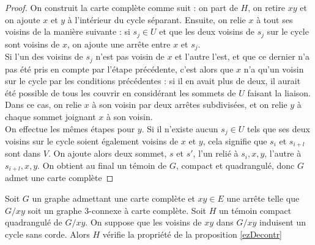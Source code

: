 \documentclass{scrartcl}
\begin{document}
\begin{flushleft}
\begin{proof}
    On construit la carte complète comme suit : on part de $H$, on retire $xy$ et on ajoute $x$ et $y$ à l'intérieur du cycle séparant.
    Ensuite, on relie $x$ à tout ses voisins de la manière suivante : si $s_j \in U$ et que les deux voisins de $s_j$ sur le cycle
    sont voisins de $x$, on ajoute une arrête entre $x$ et $s_j$.\\
    Si l'un des voisins de $s_j$ n'est pas voisin de $x$ et l'autre l'est,
    et que ce dernier n'a pas été pris en compte par l'étape précédente, c'est alors que $x$ n'a qu'un voisin sur le cycle par
    les conditions précédentes : si il en avait plus de deux, il aurait été possible de tous les couvrir en considérant les sommets
    de $U$ faisant la liaison. Dans ce cas, on relie $x$ à son voisin par deux arrêtes subdivisées, et on relie $y$ à chaque sommet
    joignant $x$ à son voisin.\\
    On effectue les mêmes étapes pour $y$. Si il n'existe aucun $s_j \in U$ tels que ses deux voisins sur le cycle soient également
    voisins de $x$ et $y$, cela signifie que $s_i$ et $s_{i+l}$ sont dans $V$. On ajoute alors deux sommet, $s$ et $s'$, l'un relié
    à $s_i, x, y$, l'autre à $s_{i+l}, x, y$. On obtient au final un témoin de $G$, compact et quadrangulé, donc $G$ admet une carte
    complète
\end{proof}

\begin{lem}
    Soit $G$ un graphe admettant une carte complète et $xy \in E$ une arrête telle que $G / xy$ soit un graphe $3$-connexe à
    carte complète. Soit $H$ un témoin compact quadrangulé de $G / xy$. On suppose que les voisins de $xy$ dans $G / xy$
    induisent un cycle sans corde.
    Alors $H$ vérifie la propriété de la proposition \ref{ezDecontr}
\end{lem}


\end{flushleft}
\end{document}
